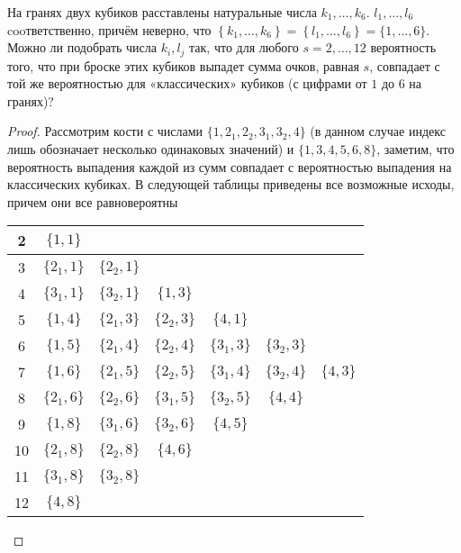     \begin{prob}
        На гранях двух кубиков расставлены натуральные числа $k_{1}, \ldots, k_{6}$. $l_{1}, \ldots, l_{6}$ cooтветственно, причём неверно, что $\left\{k_{1}, \ldots, k_{6}\right\}=\left\{l_{1}, \ldots, l_{6}\right\} = \{1, \ldots, 6\}$. Можно ли подобрать числа $k_{i}, l_{j}$ так, что для любого $s=2, \ldots, 12$ вероятность того, что при броске этих кубиков выпадет сумма очков, равная $s$, совпадает с той же вероятностью для «классических» кубиков (с цифрами от $1$ до $6$ на гранях)?
    \end{prob}
    \begin{proof}
        Рассмотрим кости с числами $\{1, 2_1, 2_2, 3_1, 3_2, 4\}$ (в данном случае индекс лишь обозначает несколько одинаковых значений) и $\{1, 3, 4, 5, 6, 8\}$, заметим, что вероятность выпадения каждой из сумм совпадает с вероятностью выпадения на классических кубиках. В следующей таблицы приведены все возможные исходы, причем они все равновероятны
        \begin{center}
            \begin{tabular}{ |c|cccccc| } 
                \hline
                2 & $\{1, 1\}$ &&&&& \\ 
                \hline
                3 & $\{2_1, 1\}$ & $\{2_2, 1\}$ &&&& \\ 
                \hline
                4 & $\{3_1, 1\}$ & $\{3_2, 1\}$ & $\{1, 3\}$ &&& \\ 
                \hline
                5 & $\{1, 4\}$ & $\{2_1, 3\}$ & $\{2_2, 3\}$ & $\{4, 1\}$ && \\ 
                \hline
                6 & $\{1, 5\}$ & $\{2_1, 4\}$ & $\{2_2, 4\}$ & $\{3_1, 3\}$ & $\{3_2, 3\}$ & \\ 
                \hline
                7 & $\{1, 6\}$ & $\{2_1, 5\}$ & $\{2_2, 5\}$ & $\{3_1, 4\}$ & $\{3_2, 4\}$ & $\{4, 3\}$ \\ 
                \hline
                8 & $\{2_1, 6\}$ & $\{2_2, 6\}$ & $\{3_1, 5\}$ & $\{3_2, 5\}$ & $\{4, 4\}$ & \\ 
                \hline
                9 & $\{1, 8\}$ & $\{3_1, 6\}$ & $\{3_2, 6\}$ & $\{4, 5\}$ && \\ 
                \hline
                10 & $\{2_1, 8\}$ & $\{2_2, 8\}$ & $\{4, 6\}$ &&& \\ 
                \hline
                11 & $\{3_1, 8\}$ & $\{3_2, 8\}$ &&&& \\ 
                \hline
                12 & $\{4, 8\}$ &&&&& \\ 
                \hline
            \end{tabular}
        \end{center}
    \end{proof}